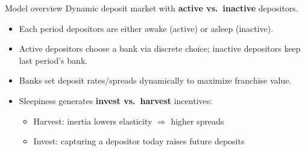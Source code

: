 \documentclass[10pt,aspectratio=169]{beamer}
\begin{document}
\begin{frame}{Model overview}
Dynamic deposit market with \textbf{active vs.\ inactive} depositors.
\begin{itemize}
	\item Each period depositors are either awake (active) or asleep (inactive).
	\item Active depositors choose a bank via discrete choice; inactive depositors keep last period’s bank.
	\item Banks set deposit rates/spreads dynamically to maximize franchise value.
	\item Sleepiness generates \textbf{invest vs.\ harvest} incentives:
	\begin{itemize}
		\item Harvest: inertia lowers elasticity $\Rightarrow$ higher spreads
		\item Invest: capturing a depositor today raises future deposits
	\end{itemize}
\end{itemize}
\end{frame}
\end{document}

